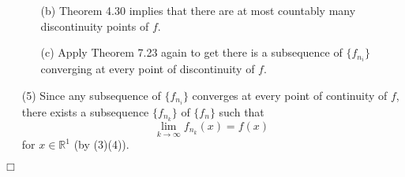 \documentclass{article}
\begin{document}
\begin{enumerate}
\begin{enumerate}
  \item[(b)]
    Theorem 4.30 implies that there are at most countably many discontinuity points of $f$.

  \item[(c)]
    Apply Theorem 7.23 again to get there is
    a subsequence of $\{f_{n_i}\}$ converging
    at every point of discontinuity of $f$.
  \end{enumerate}

\item[(5)]
  Since any subsequence of $\{f_{n_i}\}$ converges at every point of continuity of $f$,
  there exists a subsequence $\{f_{n_k}\}$ of $\{f_n\}$ such that
  \[
    \lim_{k \to \infty} f_{n_k}(x) = f(x)
  \]
  for $x \in \mathbb{R}^1$ (by (3)(4)).
\end{enumerate}
$\Box$ \\
\end{document}
